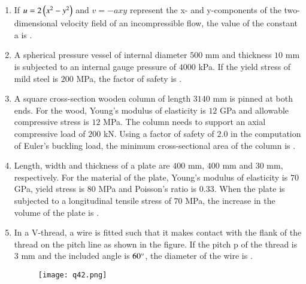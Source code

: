 \documentclass[journal,12pt,onecolumn]{IEEEtran}
\theoremstyle{remark}
\begin{document}
\begin{enumerate}
\hfill{}

\item If $u = 2\left(x^2 - y^2\right)$ and $v = -axy$ represent the x- and y-components of the two-dimensional velocity field of an incompressible flow, the value of the constant a is \underline{\hspace{2cm}}.

\hfill{}

\item A spherical pressure vessel  of internal diameter $500$ mm and thickness $10$ mm is subjected to an internal gauge pressure of $4000$ kPa. If the yield stress of mild steel is $200$ MPa, the factor of safety  is \underline{\hspace{2cm}}.

\hfill{}

\item A square cross-section wooden column of length $3140$ mm is pinned at both ends. For the wood, Young's modulus of elasticity is $12$ GPa and allowable compressive stress is $12$ MPa. The column needs to support an axial compressive load of $200$ kN. Using a factor of safety of $2.0$ in the computation of Euler's buckling load, the minimum cross-sectional area of the column is \underline{\hspace{2cm}}.

\hfill{}

\item Length, width and thickness of a plate are $400$ mm, $400$ mm and $30$ mm, respectively. For the material of the plate, Young's modulus of elasticity is $70$ GPa, yield stress is $80$ MPa and Poisson's ratio is $0.33$. When the plate is subjected to a longitudinal tensile stress of $70$ MPa, the increase in the volume of the plate is \underline{\hspace{2cm}}.

\hfill{}

\item In a V-thread, a wire is fitted such that it makes contact with the flank of the thread on the pitch line as shown in the figure. If the pitch p of the thread is $3$ mm and the included angle is $60\degree$, the diameter of the wire is \underline{\hspace{2cm}}.
\begin{figure}[h]
    \centering
    \texttt{[image: q42.png]}
    \caption*{}
    \label{fig:q42}
\end{figure}


\end{enumerate}
\end{document}
